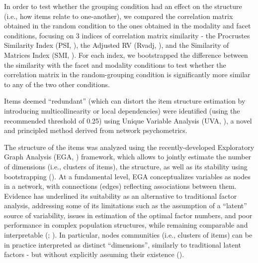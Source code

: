 \documentclass[
  jou,
  floatsintext,
  longtable,
  nolmodern,
  notxfonts,
  notimes,
  colorlinks=true,linkcolor=blue,citecolor=blue,urlcolor=blue]{apa7}
\begin{document}
In order to test whether the grouping condition had an effect on the
structure (i.e., how items relate to one-another), we compared the
correlation matrix obtained in the random condition to the ones obtained
in the modality and facet conditions, focusing on 3 indices of
correlation matrix similarity - the Procrustes Similarity Index (PSI,
), the Adjusted RV (Rvadj,
), and the
Similarity of Matrices Index (SMI,
). For each
index, we bootstrapped the difference between the similarity with the
facet and modality conditions to test whether the correlation matrix in
the random-grouping condition is significantly more similar to any of
the two other conditions.

Items deemed ``redundant'' (which can distort the item structure
estimation by introducing multicollinearity or local dependencies) were
identified (using the recommended threshold of 0.25) using Unique
Variable Analysis (UVA, ), a novel and principled method derived from network
psychometrics.

The structure of the items was analyzed using the recently-developed
Exploratory Graph Analysis (EGA, ) framework, which allows to jointly estimate
the number of dimensions (i.e., clusters of items), the structure, as
well as its stability using bootstrapping
(). At a
fundamental level, EGA conceptualizes variables as nodes in a network,
with connections (edges) reflecting associations between them. Evidence
has underlined its suitability as an alternative to traditional factor
analysis, addressing some of its limitations such as the assumption of a
``latent'' source of variability, issues in estimation of the optimal
factor numbers, and poor performance in complex population structures,
while remaining comparable and interpretable
(; ).
In particular, nodes communities (i.e., clusters of items) can be in
practice interpreted as distinct ``dimensions'', similarly to
traditional latent factors - but without explicitly assuming their
existence ().
\end{document}

